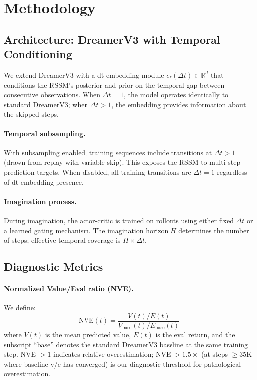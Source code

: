 \documentclass[10pt,letterpaper]{article}
\begin{document}
\section{Methodology}

\subsection{Architecture: DreamerV3 with Temporal Conditioning}

We extend DreamerV3 with a dt-embedding module $e_\theta(\Delta t) \in \mathbb{R}^d$ that conditions the RSSM's posterior and prior on the temporal gap between consecutive observations. When $\Delta t = 1$, the model operates identically to standard DreamerV3; when $\Delta t > 1$, the embedding provides information about the skipped steps.

\paragraph{Temporal subsampling.}
With subsampling enabled, training sequences include transitions at $\Delta t > 1$ (drawn from replay with variable skip). This exposes the RSSM to multi-step prediction targets. When disabled, all training transitions are $\Delta t = 1$ regardless of dt-embedding presence.

\paragraph{Imagination process.}
During imagination, the actor-critic is trained on rollouts using either fixed $\Delta t$ or a learned gating mechanism. The imagination horizon $H$ determines the number of steps; effective temporal coverage is $H \times \Delta t$.

\subsection{Diagnostic Metrics}

\paragraph{Normalized Value/Eval ratio (NVE).}
We define:
\begin{equation}
\text{NVE}(t) = \frac{V(t) / E(t)}{V_\text{base}(t) / E_\text{base}(t)}
\end{equation}
where $V(t)$ is the mean predicted value, $E(t)$ is the eval return, and the subscript ``base'' denotes the standard DreamerV3 baseline at the same training step. NVE $> 1$ indicates relative overestimation; NVE $> 1.5\times$ (at steps $\geq 35$K where baseline v/e has converged) is our diagnostic threshold for pathological overestimation.
\end{document}
